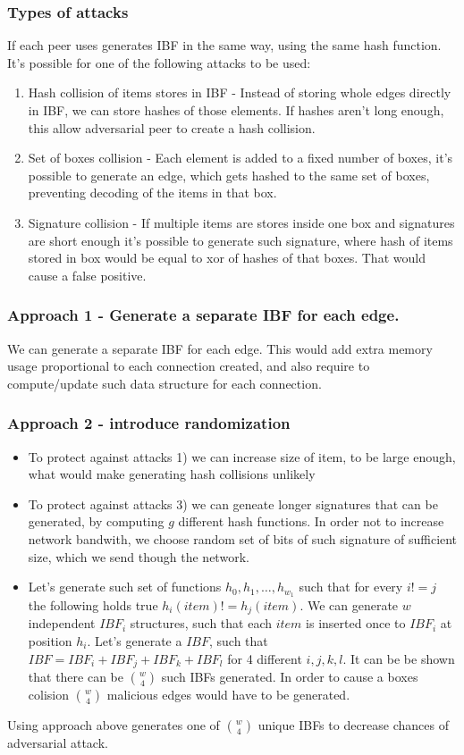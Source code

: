 \documentclass[11pt]{article}
\begin{document}
\subsubsection{Types of attacks}
If each peer uses generates IBF in the same way, using the same hash function.
It's possible for one of the following attacks to be used:
\begin{enumerate}
\item Hash collision of items stores in IBF -  Instead of storing whole edges directly in IBF, we can store hashes of those elements.
If hashes aren't long enough, this allow adversarial peer to create a hash collision.
\item Set of boxes collision - Each element is added to a fixed number of boxes, it's possible to generate an edge, which gets hashed to the same set of boxes, preventing decoding of the items in that box.
\item Signature collision - If multiple items are stores inside one box and signatures are short enough it's possible to generate such signature, where hash of items stored in box would be equal to xor of hashes of that boxes.
That would cause a false positive.
\end{enumerate}
\subsubsection{Approach 1 - Generate a separate IBF for each edge.}
We can generate a separate IBF for each edge.
This would add extra memory usage proportional to each connection created, and also require to compute/update such data structure for each connection.
\subsubsection{Approach 2 - introduce randomization}
\begin{itemize}
\item To protect against attacks 1) we can increase size of item, to be large enough, what would make generating hash collisions unlikely
\item To protect against attacks 3) we can geneate longer signatures that can be generated, by computing $g$ different hash functions.
In order not to increase network bandwith, we choose random set of bits of such signature of sufficient size, which we send though the network.
\item Let's generate such set of functions $h_0, h_1, \ldots, h_{w_1}$ such that for every $i != j$ the following holds true $h_i(item) != h_j(item)$.
We can generate $w$ independent $IBF_i$ structures, such that each $item$ is inserted once to $IBF_i$ at position $h_i$.
Let's generate a  $IBF$, such that $IBF = IBF_i + IBF_j + IBF_k + IBF_l$ for 4 different $i,j,k,l$.
It can be be shown that there can be $\binom{w}{4}$ such IBFs generated.
In order to cause a boxes colision $\binom{w}{4}$ malicious edges would have to be generated.

\end{itemize}
Using approach above generates one of $\binom{w}{4}$ unique IBFs to decrease chances of adversarial attack.
\end{document}
